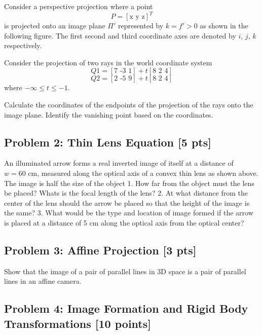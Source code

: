 \documentclass[11pt]{article}
\begin{document}
Consider a perspective projection where a point \[
P = [\text{x y z}]^T
\] is projected onto an image plane \(\Pi'\) represented by \(k = f'>0\)
as shown in the following figure. The first second and third coordinate
axes are denoted by \(i\), \(j\), \(k\) respectively.

Consider the projection of two rays in the world coordinate system \[
Q1 = [\text{7 -3 1}] + t[\text{8 2 4}]
\] \[
Q2 = [\text{2 -5 9}] + t[\text{8 2 4}]
\] where \(-\infty \leq t \leq -1\).

Calculate the coordinates of the endpoints of the projection of the rays
onto the image plane. Identify the vanishing point based on the
coordinates.

    \hypertarget{problem-2-thin-lens-equation-5-pts}{%
\subsection{Problem 2: Thin Lens Equation {[}5
pts{]}}\label{problem-2-thin-lens-equation-5-pts}}

An illuminated arrow forms a real inverted image of itself at a distance
of \(w = 60\text{ cm}\), measured along the optical axis of a convex
thin lens as shown above. The image is half the size of the object 1.
How far from the object must the lens be placed? Whats is the focal
length of the lens? 2. At what distance from the center of the lens
should the arrow be placed so that the height of the image is the same?
3. What would be the type and location of image formed if the arrow is
placed at a distance of 5 cm along the optical axis from the optical
center?

    \hypertarget{problem-3-affine-projection-3-pts}{%
\subsection{Problem 3: Affine Projection {[}3
pts{]}}\label{problem-3-affine-projection-3-pts}}

Show that the image of a pair of parallel lines in 3D space is a pair of
parallel lines in an affine camera.

    \hypertarget{problem-4-image-formation-and-rigid-body-transformations-10-points}{%
\subsection{Problem 4: Image Formation and Rigid Body Transformations
{[}10
points{]}}\label{problem-4-image-formation-and-rigid-body-transformations-10-points}}
\end{document}
